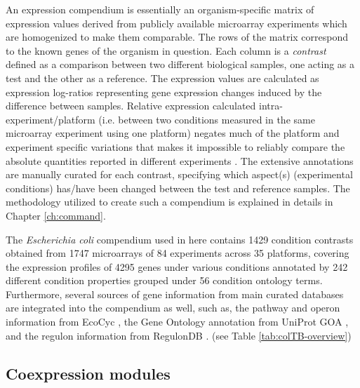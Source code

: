 An expression compendium is essentially an organism-specific matrix of expression values derived from publicly available microarray experiments which are homogenized to make them comparable. The rows of the matrix correspond to the known genes of the organism in question. Each column is a \textit{contrast} defined as a comparison between two different biological samples, one acting as a test and the other as a reference. The expression values are calculated as expression log-ratios representing gene expression changes induced by the difference between samples. Relative expression calculated intra-experiment/platform (i.e. between two conditions measured in the same microarray experiment using one platform) negates much of the platform and experiment specific variations that makes it impossible to reliably compare the absolute quantities reported in different experiments \cite{Shi2006}. The extensive annotations are manually curated for each contrast, specifying which aspect(s) (experimental conditions) has/have been changed between the test and reference samples. The methodology utilized to create such a compendium is explained in details in Chapter \ref{ch:command}.

The \textit{Escherichia coli} compendium used in here contains 1429 condition contrasts obtained from 1747 microarrays of 84 experiments across 35 platforms, covering the expression profiles of 4295 genes under various conditions annotated by 242 different condition properties grouped under 56 condition ontology terms. Furthermore, several sources of gene information from main curated databases are integrated into the compendium as well, such as, the pathway and operon information from EcoCyc \cite{Keseler2009}, the Gene Ontology annotation from UniProt GOA \cite{Camon2004}, and the regulon information from RegulonDB \cite{Gama-Castro2008}. (see Table \ref{tab:colTB-overview}) 

\subsection{Coexpression modules}


